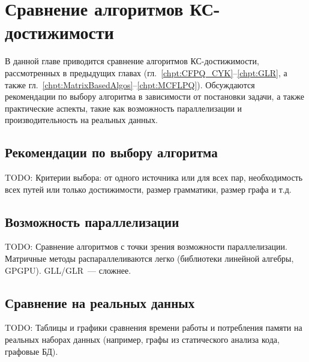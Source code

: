 \setchapterpreamble[u]{\margintoc}
\chapter{Сравнение алгоритмов КС-достижимости}
\label{chpt:CFPQ_Comparison}

В данной главе приводится сравнение алгоритмов КС-достижимости, рассмотренных в предыдущих главах (гл.~\ref{chpt:CFPQ_CYK}--\ref{chpt:GLR}, а также гл.~\ref{chpt:MatrixBasedAlgos}--\ref{chpt:MCFLPQ}).
Обсуждаются рекомендации по выбору алгоритма в зависимости от постановки задачи, а также практические аспекты, такие как возможность параллелизации и производительность на реальных данных.

\section{Рекомендации по выбору алгоритма}

TODO: Критерии выбора: от одного источника или для всех пар, необходимость всех путей или только достижимости, размер грамматики, размер графа и т.д.

\section{Возможность параллелизации}

TODO: Сравнение алгоритмов с точки зрения возможности параллелизации. Матричные методы распараллеливаются легко (библиотеки линейной алгебры, GPGPU). GLL/GLR~--- сложнее.

\section{Сравнение на реальных данных}

TODO: Таблицы и графики сравнения времени работы и потребления памяти на реальных наборах данных (например, графы из статического анализа кода, графовые БД).
